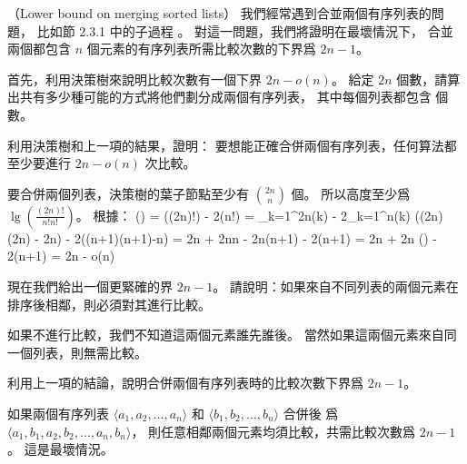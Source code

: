\startPROBLEM
（Lower bound on merging sorted lists）
我們經常遇到合並兩個有序列表的問題，
比如節 2.3.1 中的子過程 。
對這一問題，我們將證明在最壞情況下，
合並兩個都包含 $n$ 個元素的有序列表所需比較次數的下界爲 $2n-1$。

首先，利用決策樹來說明比較次數有一個下界 $2n-o(n)$。
\startigBase[a]\startitem
給定 $2n$ 個數，請算出共有多少種可能的方式將他們劃分成兩個有序列表，
其中每個列表都包含  個數。
\stopitem\stopigBase

\startANSWER
\startformula
{}
\stopformula
\stopANSWER

\startigBase[a,continue]\startitem
利用決策樹和上一項的結果，證明：
要想能正確合併兩個有序列表，任何算法都至少要進行 $2n-o(n)$ 次比較。
\stopitem\stopigBase

\startANSWER
要合併兩個列表，決策樹的葉子節點至少有 $\binom{2n}{n}$ 個。
所以高度至少爲 $\lg\left(\frac{(2n)!}{n! n!}\right)$。
根據：
\startsplitformula\startmathalignment
\NC \lg\left(\right)
    \NC = \lg((2n)!) - 2\lg(n!) \NR
\NC \NC = \sum_{k=1}^{2n}\lg(k) - 2\sum_{k=1}^{n}\lg(k) \NR
\NC \NC \ge \left((2n)\lg(2n) - 2n\right) - 2\left((n+1)\lg(n+1)-n\right) \NR
\NC \NC = 2n + 2n\lg n - 2n\lg(n+1) - 2\lg(n+1) \NR
\NC \NC = 2n + 2n \lg() - 2\lg(n+1) \NR
\NC \NC = 2n - o(n) \NR
\stopmathalignment\stopsplitformula
\stopANSWER

現在我們給出一個更緊確的界 $2n-1$。
\startigBase[a,continue]\startitem
請說明：如果來自不同列表的兩個元素在排序後相鄰，則必須對其進行比較。
\stopitem\stopigBase

\startANSWER
如果不進行比較，我們不知道這兩個元素誰先誰後。
當然如果這兩個元素來自同一個列表，則無需比較。
\stopANSWER

\startigBase[a,continue]\startitem
利用上一項的結論，說明合併兩個有序列表時的比較次數下界爲 $2n-1$。
\stopitem\stopigBase

\startANSWER
如果兩個有序列表
 $\langle a_1,a_2,\ldots,a_n\rangle$ 和
 $\langle b_1,b_2,\ldots,b_n\rangle$ 合併後
爲 $\langle a_1,b_1,a_2,b_2,\ldots,a_n,b_n\rangle$，
則任意相鄰兩個元素均須比較，共需比較次數爲 $2n-1$。
這是最壞情況。
\stopANSWER

\stopPROBLEM
